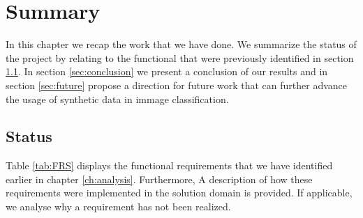 \chapter{Summary}\label{ch:summary}

In this chapter we recap the work that we have done. We summarize the status of the project by relating to the functional that were previously identified in section \ref{sec:status}. In section \ref{sec:conclusion} we present a conclusion of our results and in section \ref{sec:future} propose a direction for future work that can further advance the usage of synthetic data in immage classification.


\section{Status}\label{sec:status}

Table \ref{tab:FRS} displays the functional requirements that we have identified earlier in chapter \ref{ch:analysis}. Furthermore, A description of how these requirements were implemented in the solution domain is provided. If applicable, we analyse why a requirement has not been realized.

